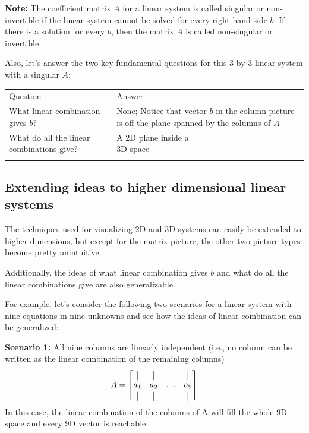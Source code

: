 \documentclass[../main.tex]{subfiles}
\begin{document}
\textbf{Note:} The coefficient matrix \(A\) for a linear system is called singular or non-invertible if the linear system cannot be solved for every right-hand side \(b\). If there is a solution for every \(b\), then the matrix \(A\) is called non-singular or invertible.
\vspace{0.5em}

Also, let's answer the two key fundamental questions for this 3-by-3 linear system with a singular \(A\):

\begin{tabular}{@{}ll@{}}
    \trule
    \textrm{Question}                         & \textrm{Answer}                          \\
    \mrule
    What linear combination gives \(b\)?      & \makecell{None; Notice that vector \(b\) \\ in the column picture is off \\ the plane spanned by the \\ columns of \(A\)} \\
    What do all the linear combinations give? & \makecell{A 2D plane inside a            \\ 3D space} \\
    \brule
\end{tabular}


\subsection{Extending ideas to higher dimensional linear systems}
The techniques used for visualizing 2D and 3D systems can easily be extended to higher dimensions, but except for the matrix picture, the other two picture types become pretty unintuitive.
\vspace{0.5em}

Additionally, the ideas of what linear combination gives \(b\) and what do all the linear combinations give are also generalizable.
\vspace{0.5em}

For example, let's consider the following two scenarios for a linear system with nine equations in nine unknowns and see how the ideas of linear combination can be generalized:

\textbf{Scenario 1:} All nine columns are linearly independent
(i.e., no column can be written as the linear combination of the remaining columns)
\[
    A
    =
    \begin{bmatrix}
        \vertbar & \vertbar &        & \vertbar \\
        a_{1}    & a_{2}    & \ldots & a_{9}    \\
        \vertbar & \vertbar &        & \vertbar \\
    \end{bmatrix}
\]
In this case, the linear combination of the columns of A will fill the whole 9D space and every 9D vector is reachable.
\end{document}

